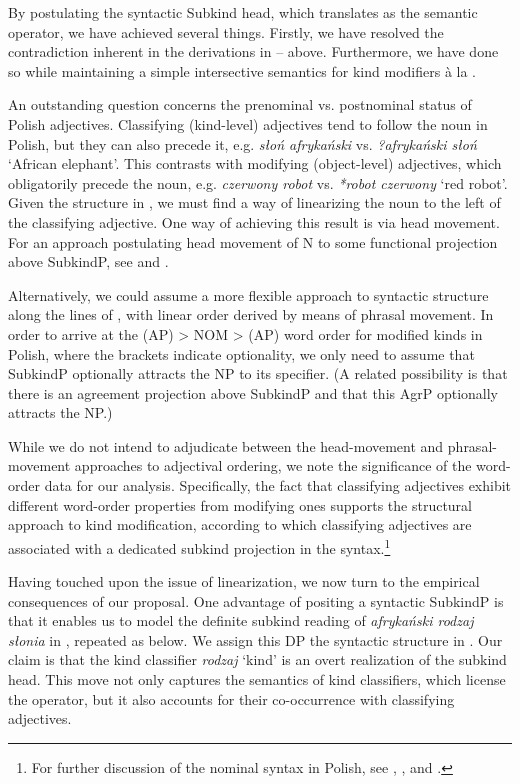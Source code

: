 \documentclass[output=paper,
colorlinks,
citecolor=brown,
newtxmath
]{langscibook}
\begin{document}
\noindent
By postulating the syntactic Subkind head, which translates as the semantic  operator, we have achieved several things. Firstly, we have resolved the contradiction inherent in the derivations in -- above. Furthermore, we have done so while maintaining a simple intersective semantics for kind modifiers à la \citet{McNally.Boleda2004}.

An outstanding question concerns the prenominal vs. postnominal status of Polish adjectives. Classifying (kind-level) adjectives tend to follow the noun in Polish, but they can also precede it, e.g. \textit{słoń afrykański} vs. \textit{?afrykański słoń} `African elephant'. This contrasts with modifying (object-level) adjectives, which obligatorily precede the noun, e.g. \textit{czerwony robot} vs. \textit{*robot czerwony} `red robot'. Given the structure in , we must find a way of linearizing the noun to the left of the classifying adjective. One way of achieving this result is via head movement. For an approach postulating head movement of N to some functional projection above SubkindP, see \citet{Rutkowski.Progovac2005} and \citet{Rutkowski2012}.

Alternatively, we could assume a more flexible approach to syntactic structure along the lines of \citet{Cinque2005, Cinque2010}, with linear order derived by means of phrasal movement. In order to arrive at the (AP) > NOM > (AP) word order for modified kinds in Polish, where the brackets indicate optionality, we only need to assume that SubkindP optionally attracts the NP to its specifier. (A related possibility is that there is an agreement projection above SubkindP and that this AgrP optionally attracts the NP.)

While we do not intend to adjudicate between the head-movement and phrasal-movement approaches to adjectival ordering, we note the significance of the word-order data for our analysis. Specifically, the fact that classifying adjectives exhibit different word-order properties from modifying ones supports the structural approach to kind modification, according to which classifying adjectives are associated with a dedicated subkind projection in the syntax.\footnote{For further discussion of the nominal syntax in Polish, see \cite{Ceglowski2017}, \cite{Witkos.etal2018}, and \cite{Witkos.Dziubala.Szrejbrowska2018}.}

Having touched upon the issue of linearization, we now turn to the empirical consequences of our proposal. One advantage of positing a syntactic SubkindP is that it enables us to model the definite subkind reading of \textit{afrykański rodzaj słonia} in , repeated as  below. We assign this DP the syntactic structure in . Our claim is that the kind classifier \textit{rodzaj} `kind' is an overt realization of the subkind head. This move not only  captures the semantics of kind classifiers, which license the  operator, but it also accounts for their co-occurrence with classifying adjectives.
\end{document}
